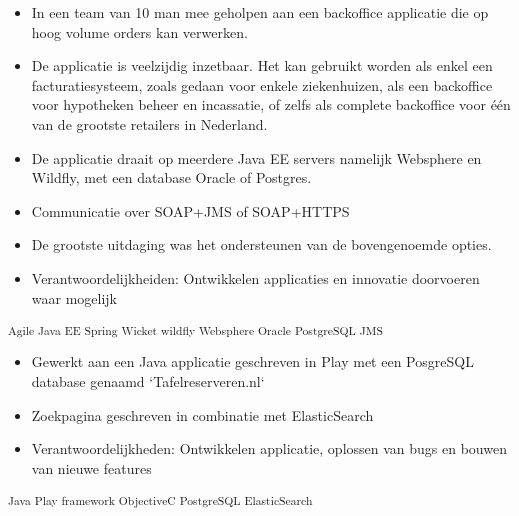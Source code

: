 \documentclass[]{deedy-resume-openfont}
\begin{document}
\begin{minipage}[t]{0.74\textwidth}
\vspace{-2mm}
\begin{itemize} \setlength\itemsep{0.1em}
\item In een team van 10 man mee geholpen aan een backoffice applicatie die op hoog volume orders kan verwerken. 
\item De applicatie is veelzijdig inzetbaar. 
	Het kan gebruikt worden als enkel een facturatiesysteem, zoals gedaan voor enkele ziekenhuizen, als een backoffice voor hypotheken beheer en incassatie, of zelfs 
	als complete backoffice voor één van de grootste retailers in Nederland. 
\item De applicatie draait op meerdere Java EE servers namelijk Websphere en Wildfly, met een database Oracle of Postgres.
\item Communicatie over SOAP+JMS of SOAP+HTTPS 
\item De grootste uitdaging was het ondersteunen van de bovengenoemde opties.
\item Verantwoordelijkheiden: Ontwikkelen applicaties en innovatie doorvoeren waar mogelijk
\end{itemize}
\vspace{-4mm}

\textsubscript{Agile \textbullet{} Java EE\textbullet{} Spring \textbullet{} Wicket \textbullet{} wildfly \textbullet{} Websphere \textbullet{} Oracle \textbullet{} PostgreSQL \textbullet{} JMS}
\sectionsep

\vspace{-2mm}
\begin{itemize} \setlength\itemsep{0.1em}
\item Gewerkt aan een Java applicatie geschreven in Play met een PosgreSQL database genaamd `Tafelreserveren.nl`
\item Zoekpagina geschreven in combinatie met ElasticSearch
\item Verantwoordelijkheden: Ontwikkelen applicatie, oplossen van bugs en bouwen van nieuwe features
\end{itemize}
\vspace{-4mm}
\textsubscript{Java\textbullet{} Play framework \textbullet{} ObjectiveC \textbullet{} PostgreSQL \textbullet{} ElasticSearch}
\sectionsep

\end{minipage} 
\pagebreak
\end{document}
